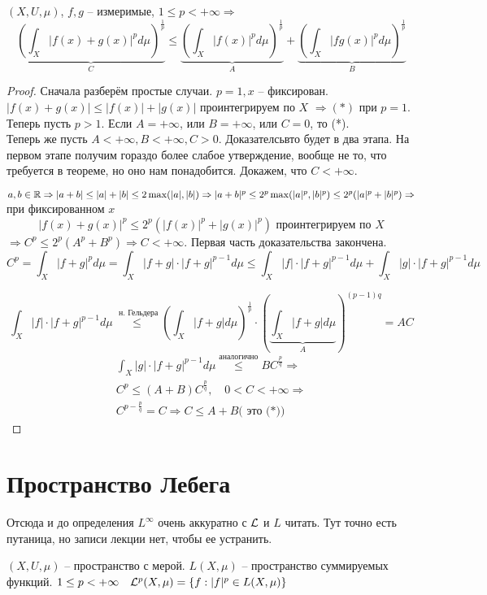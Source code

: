 \documentclass[document]{subfiles}
\begin{document}
\begin{theorem}
    $(X, U, \mu)$, $f, g$ -- измеримые, $1 \leq p < + \infty \Rightarrow$
    \[ \underbrace{\left( \int_X |f(x) + g(x)|^p d \mu \right)^{\frac{1}{p}}}_{C}  \leq \underbrace{\left( \int_X |f(x)|^p d \mu \right)^{\frac{1}{p}}}_{A} + 
    \underbrace{\left( \int_X |fg(x)|^p d \mu \right)^{\frac{1}{p}}}_{B} \tag{*} \]
    
\end{theorem}
\begin{proof}
    Сначала разберём простые случаи. $p = 1, x$ -- фиксирован. $|f(x) + g(x)| \leq |f(x)| + |g(x)|$ проинтегрируем по $X$ $\Rightarrow (*)$ при $p = 1$.
    Теперь пусть $p > 1$. Если $A = +\infty$, или $B = +\infty$, или $C = 0$, то (*). \\
    Теперь же пусть $A < +\infty, B < +\infty, C > 0$. 
    Доказателсьвто будет в два этапа. На первом этапе получим гораздо более слабое утверждение, вообще не то, что требуется в теореме, но оно нам понадобится.
    Докажем, что $C < + \infty$.
    
    $a,b \in \mathbb{R} \Rightarrow |a+b| \leq |a| + |b| \leq 2 \max(|a|, |b|) \Rightarrow |a+b|^p \leq 2^p \max(|a|^p, |b|^p) \leq 2^p(|a|^p + |b|^p) \Rightarrow$
    при фиксированном $x$ 
    \[ |f(x) + g(x) |^p \leq 2^p (|f(x)|^p + |g(x)|^p) \text{ проинтегрируем по } X \]
    $\Rightarrow C^p \leq 2^p(A^p + B^p) \Rightarrow C < + \infty$.
    Первая часть доказательства закончена. \\
    \[ C^p = \int_X |f+g|^p d \mu = \int_X |f+g| \cdot |f + g|^{p-1} d \mu \leq \int_X |f| \cdot |f+g|^{p-1} d\mu + \int_X |g| \cdot |f+g|^{p-1} d \mu \]

    \[ \int_X |f| \cdot |f+g|^{p-1} d\mu \stackrel{\text{ н. Гельдера}}{\leq} \left( \int_X |f+g| d\mu \right)^{\frac{1}{p}} \cdot \left( \underbrace{\int_X |f+g| d\mu}_{A} \right)^{(p-1)q} %
    = AC \]
    \begin{gather*}
        \int_X |g| \cdot |f+g|^{p-1} d \mu \stackrel{\text{аналогично}}{\leq} BC^{\frac{p}{q}} \Rightarrow \\
        C^p \leq (A+B) C^{\frac{p}{q}}, \quad 0 < C < + \infty \Rightarrow \\
        C^{p - \frac{p}{q}} = C \Rightarrow C \leq A + B \text{( это (*))}
    \end{gather*}
\end{proof}

\section{Пространство Лебега}
Отсюда и до определения $L^\infty$ очень аккуратно с $\mathcal{L}$ и $L$ читать. Тут точно есть путаница, но записи лекции нет, чтобы ее устранить.
\begin{definition}
    $(X, U, \mu)$ -- пространство с мерой. $L(X, \mu)$ -- пространство суммируемых функций. $1 \leq p < +\infty \quad \mathcal{L}^p(X, \mu) = \{ f: |f|^p \in L(X,\mu) \}$ 
\end{definition}
\end{document}
